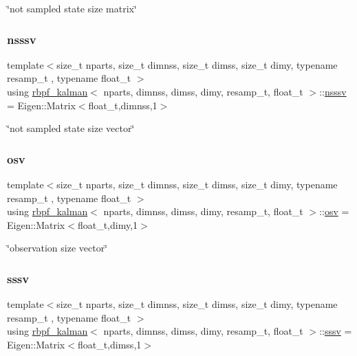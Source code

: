 \char`\"{}not sampled state size matrix\char`\"{} \mbox{\label{classrbpf__kalman_aea6e6dd087b2fca63be4e480dcf0d1c3}} 
\subsubsection{\texorpdfstring{nsssv}{nsssv}}
{\footnotesize\ttfamily template$<$size\+\_\+t nparts, size\+\_\+t dimnss, size\+\_\+t dimss, size\+\_\+t dimy, typename resamp\+\_\+t , typename float\+\_\+t $>$ \\
using \hyperlink{classrbpf__kalman}{rbpf\+\_\+kalman}$<$ nparts, dimnss, dimss, dimy, resamp\+\_\+t, float\+\_\+t $>$\+::\hyperlink{classrbpf__kalman_aea6e6dd087b2fca63be4e480dcf0d1c3}{nsssv} =  Eigen\+::\+Matrix$<$float\+\_\+t,dimnss,1$>$}

\char`\"{}not sampled state size vector\char`\"{} \mbox{\label{classrbpf__kalman_ae6e59c034c1b0abc7871887ae088055e}} 
\subsubsection{\texorpdfstring{osv}{osv}}
{\footnotesize\ttfamily template$<$size\+\_\+t nparts, size\+\_\+t dimnss, size\+\_\+t dimss, size\+\_\+t dimy, typename resamp\+\_\+t , typename float\+\_\+t $>$ \\
using \hyperlink{classrbpf__kalman}{rbpf\+\_\+kalman}$<$ nparts, dimnss, dimss, dimy, resamp\+\_\+t, float\+\_\+t $>$\+::\hyperlink{classrbpf__kalman_ae6e59c034c1b0abc7871887ae088055e}{osv} =  Eigen\+::\+Matrix$<$float\+\_\+t,dimy,1$>$}

\char`\"{}observation size vector\char`\"{} \mbox{\label{classrbpf__kalman_a616e56c08c1a6b476e065b2200433915}} 
\subsubsection{\texorpdfstring{sssv}{sssv}}
{\footnotesize\ttfamily template$<$size\+\_\+t nparts, size\+\_\+t dimnss, size\+\_\+t dimss, size\+\_\+t dimy, typename resamp\+\_\+t , typename float\+\_\+t $>$ \\
using \hyperlink{classrbpf__kalman}{rbpf\+\_\+kalman}$<$ nparts, dimnss, dimss, dimy, resamp\+\_\+t, float\+\_\+t $>$\+::\hyperlink{classrbpf__kalman_a616e56c08c1a6b476e065b2200433915}{sssv} =  Eigen\+::\+Matrix$<$float\+\_\+t,dimss,1$>$}

